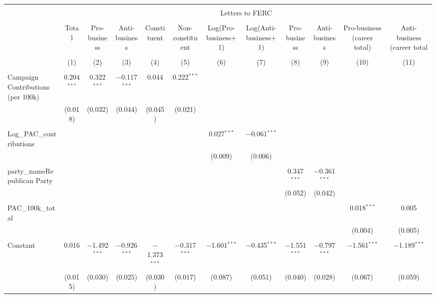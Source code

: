 
\begin{tabular}{@{\extracolsep{5pt}}lccccccccccc} 
\\[-1.8ex]\hline 
\hline \\[-1.8ex] 
 & \multicolumn{11}{c}{Letters to FERC} \\ 
\cline{2-12} 
\\[-1.8ex] & Total & Pro-business & Anti-business & Constituent & Non-constituent & Log(Pro-business+1) & Log(Anti-business+1) & Pro-business & Anti-business & Pro-business (career total) & Anti-business (career total \\ 
\\[-1.8ex] & (1) & (2) & (3) & (4) & (5) & (6) & (7) & (8) & (9) & (10) & (11)\\ 
\hline \\[-1.8ex] 
 Campaign Contributions (per 100k) & 0.204$^{***}$ & 0.322$^{***}$ & $-$0.117$^{***}$ & 0.044 & 0.222$^{***}$ &  &  &  &  &  &  \\ 
  & (0.018) & (0.032) & (0.044) & (0.045) & (0.021) &  &  &  &  &  &  \\ 
  & & & & & & & & & & & \\ 
 Log\_PAC\_contributions &  &  &  &  &  & 0.027$^{***}$ & $-$0.061$^{***}$ &  &  &  &  \\ 
  &  &  &  &  &  & (0.009) & (0.006) &  &  &  &  \\ 
  & & & & & & & & & & & \\ 
 party\_nameRepublican Party &  &  &  &  &  &  &  & 0.347$^{***}$ & $-$0.361$^{***}$ &  &  \\ 
  &  &  &  &  &  &  &  & (0.052) & (0.042) &  &  \\ 
  & & & & & & & & & & & \\ 
 PAC\_100k\_total &  &  &  &  &  &  &  &  &  & 0.018$^{***}$ & 0.005 \\ 
  &  &  &  &  &  &  &  &  &  & (0.004) & (0.005) \\ 
  & & & & & & & & & & & \\ 
 Constant & 0.016 & $-$1.492$^{***}$ & $-$0.926$^{***}$ & $-$1.373$^{***}$ & $-$0.317$^{***}$ & $-$1.601$^{***}$ & $-$0.435$^{***}$ & $-$1.551$^{***}$ & $-$0.797$^{***}$ & $-$1.561$^{***}$ & $-$1.189$^{***}$ \\ 
  & (0.015) & (0.030) & (0.025) & (0.030) & (0.017) & (0.087) & (0.051) & (0.040) & (0.028) & (0.067) & (0.059) \\ 

\end{tabular}
